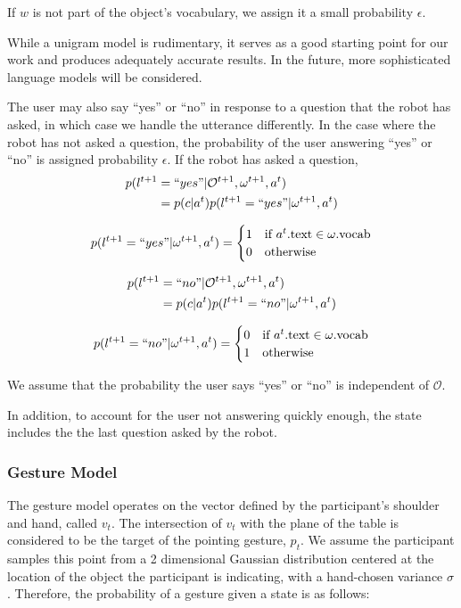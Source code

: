 \documentclass[letterpaper]{article}
\begin{document}
If $w$ is not part of the object's vocabulary, we assign it a small probability $\epsilon$. 

While a unigram model is rudimentary, it serves as a good starting point for our work and produces adequately accurate results. In the future, more sophisticated language models will be considered. 

The user may also say ``yes'' or ``no'' in response to a question that the robot has asked, in which case we handle the utterance differently. In the case where the robot has not asked a question, the probability of the user answering ``yes'' or ``no'' is assigned probability $\epsilon$. If the robot has asked a question, 
\begin{align*}
	p(l^{t+1} &= ``yes" | \mathcal{O}^{t+1}, \omega^{t+1}, a^t)  \\
	&= p(c|a^t)p(l^{t+1} = ``yes" | \omega^{t+1}, a^t) 
\end{align*}

\begin{equation}
	p(l^{t+1} = ``yes" | \omega^{t+1}, a^t) = \begin{cases}
		1  & \text{if  $a^t.\text{text} \in \omega.\text{vocab}$} \\
		0  & \text{otherwise}
	\end{cases}
\end{equation}


\begin{align*}
	p(l^{t+1} &= ``no" | \mathcal{O}^{t+1}, \omega^{t+1}, a^t)  \\
	&= p(c|a^t)p(l^{t+1} = ``no" | \omega^{t+1}, a^t) 
\end{align*}

\begin{equation}
	p(l^{t+1}=``no" | \omega^{t+1}, a^t) = \begin{cases}
		0  & \text{if  $a^t.\text{text} \in \omega.\text{vocab}$} \\
		1  & \text{otherwise}
	\end{cases}
\end{equation}

We assume that the probability the user says ``yes'' or ``no'' is independent of $\mathcal{O}$.

In addition, to account for the user not answering quickly enough, the state includes the the last question asked by the robot.


\subsubsection{Gesture Model}
The gesture model operates on the vector defined by the participant's shoulder and hand, called $v_t$. The intersection of $v_t$ with the plane of the table is considered to be the target of the pointing gesture, $p_t$. We assume the participant samples this point from a 2 dimensional Gaussian distribution centered at the location of the object the
participant is indicating, with a hand-chosen variance $\sigma$. Therefore, the probability of a gesture given a state
is as follows: 
\end{document}
